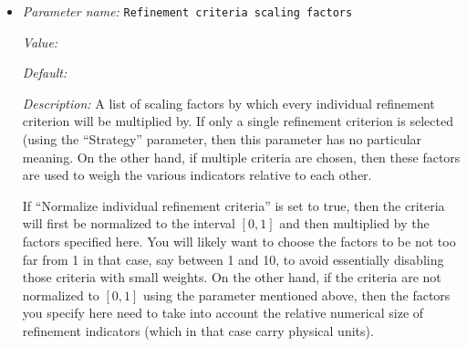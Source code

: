 \begin{itemize}
{\it Value:} max


{\it Default:} max


{\it Description:} If multiple mesh refinement criteria are computed for each cell (by passing a list of more than element to the \texttt{Strategy} parameter in this section of the input file) then one will have to decide which one should win when deciding which cell to refine. The operation that selects from these competing criteria is the one that is selected here. The options are:

\begin{itemize}
\item \texttt{plus}: Add the various error indicators together and refine those cells on which the sum of indicators is largest.
\item \texttt{max}: Take the maximum of the various error indicators and refine those cells on which the maximal indicators is largest.
\end{itemize}The refinement indicators computed by each strategy are modified by the ``Normalize individual refinement criteria'' and ``Refinement criteria scale factors'' parameters.


{\it Possible values:} [Selection plus|max ]
\item {\it Parameter name:} {\tt Refinement criteria scaling factors}
\label{parameters:Mesh refinement/Refinement criteria scaling factors}


{\it Value:} 


{\it Default:} 


{\it Description:} A list of scaling factors by which every individual refinement criterion will be multiplied by. If only a single refinement criterion is selected (using the ``Strategy'' parameter, then this parameter has no particular meaning. On the other hand, if multiple criteria are chosen, then these factors are used to weigh the various indicators relative to each other. 

If ``Normalize individual refinement criteria'' is set to true, then the criteria will first be normalized to the interval $[0,1]$ and then multiplied by the factors specified here. You will likely want to choose the factors to be not too far from 1 in that case, say between 1 and 10, to avoid essentially disabling those criteria with small weights. On the other hand, if the criteria are not normalized to $[0,1]$ using the parameter mentioned above, then the factors you specify here need to take into account the relative numerical size of refinement indicators (which in that case carry physical units).


\end{itemize}
